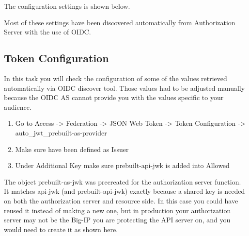 \documentclass[letterpaper,10pt,english]{sphinxmanual}
\begin{document}
The configuration settings is shown below.
\begin{quote}

\noindent{}
\end{quote}

Most of these settings have been discovered automatically from Authorization Server with the use of OIDC.


\subsection{Token Configuration}
\label{\detokenize{class2/module1/module1:token-configuration}}
In this task you will check the configuration of some of the values retrieved automatically via OIDC discover tool. Those values had to be adjusted manually because the OIDC AS cannot provide you with the values specific to your audience.
\begin{enumerate}
\item {} 
Go to Access -\textgreater{} Federation -\textgreater{} JSON Web Token -\textgreater{} Token Configuration
-\textgreater{} auto\_jwt\_prebuilt-as-provider

\item {} 
Make sure  have been defined as Issuer

\end{enumerate}
\begin{quote}

\noindent{}
\end{quote}
\begin{enumerate}
\setcounter{enumi}{2}
\item {} 
Under Additional Key make sure prebuilt-api-jwk is added into Allowed

\end{enumerate}
\begin{quote}

\noindent{}
\end{quote}

The object prebuilt-as-jwk was precreated for the authorization server
function. It matches api-jwk (and prebuilt-api-jwk) exactly because a
shared key is needed on both the authorization server and resource side.
In this case you could have reused it instead of making a new one, but
in production your authorization server may not be the Big-IP you are
protecting the API server on, and you would need to create it as shown
here.
\end{document}
